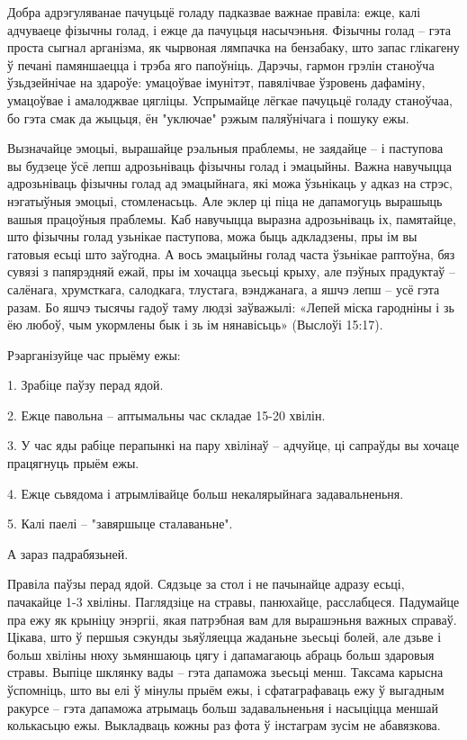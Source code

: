 Добра адрэгуляванае пачуцьцё голаду падказвае важнае правіла: ежце, калі адчуваеце фізычны голад, і ежце да пачуцьця насычэньня. Фізычны голад – гэта проста сыгнал арганізма, як чырвоная лямпачка на бензабаку, што запас глікагену ў печані памяншаецца і трэба яго папоўніць. Дарэчы, гармон грэлін станоўча ўзьдзейнічае на здароўе: умацоўвае імунітэт, павялічвае ўзровень дафаміну, умацоўвае і амалоджвае цягліцы. Успрымайце лёгкае пачуцьцё голаду станоўчаа, бо гэта смак да жыцьця, ён "уключае" рэжым паляўнічага і пошуку ежы.

Вызначайце эмоцыі, вырашайце рэальныя праблемы, не заядайце – і паступова вы будзеце ўсё лепш адрозьніваць фізычны голад і эмацыйны. Важна навучыцца адрозьніваць фізычны голад ад эмацыйнага, які можа ўзьнікаць у адказ на стрэс, нэгатыўныя эмоцыі, стомленасьць. Але эклер ці піца не дапамогуць вырашыць вашыя працоўныя праблемы. Каб навучыцца выразна адрозьніваць іх, памятайце, што фізычны голад узьнікае паступова, можа быць адкладзены, пры ім вы гатовыя есьці што заўгодна. А вось эмацыйны голад часта ўзьнікае раптоўна, бяз сувязі з папярэдняй ежай, пры ім хочацца зьесьці крыху, але пэўных прадуктаў – салёнага, хрумсткага, салодкага, тлустага, вэнджанага, а яшчэ лепш – усё гэта разам. Бо яшчэ тысячы гадоў таму людзі заўважылі: «Лепей міска гародніны і зь ёю любоў, чым укормлены бык і зь ім нянавісьць» (Выслоўі 15:17).

Рэарганізуйце час прыёму ежы:

1. Зрабіце паўзу перад ядой.

2. Ежце павольна – аптымальны час складае 15-20 хвілін.

3. У час яды рабіце перапынкі на пару хвілінаў – адчуйце, ці сапраўды вы хочаце працягнуць прыём ежы.

4. Ежце сьвядома і атрымлівайце больш некалярыйнага задавальненьня.

5. Калі паелі – "завяршыце сталаваньне".

А зараз падрабязьней.

Правіла паўзы перад ядой. Сядзьце за стол і не пачынайце адразу есьці, пачакайце 1-3 хвіліны. Паглядзіце на стравы, панюхайце, расслабцеся. Падумайце пра ежу як крыніцу энэргіі, якая патрэбная вам для вырашэньня важных справаў. Цікава, што ў першыя сэкунды зьяўляецца жаданьне зьесьці болей, але дзьве і больш хвіліны нюху зьмяншаюць цягу і дапамагаюць абраць больш здаровыя стравы. Выпіце шклянку вады – гэта дапаможа зьесьці менш. Таксама карысна ўспомніць, што вы елі ў мінулы прыём ежы, і сфатаграфаваць ежу ў выгадным ракурсе – гэта дапаможа атрымаць больш задавальненьня і насыціцца меншай колькасьцю ежы. Выкладваць кожны раз фота ў інстаграм зусім не абавязкова.

